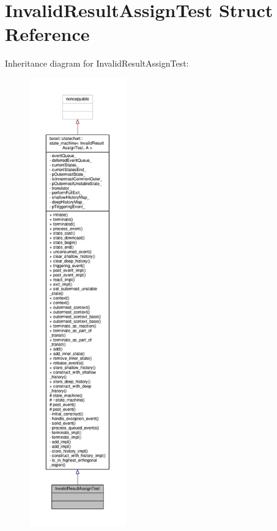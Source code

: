 \hypertarget{struct_invalid_result_assign_test}{}\section{Invalid\+Result\+Assign\+Test Struct Reference}
\label{struct_invalid_result_assign_test}


Inheritance diagram for Invalid\+Result\+Assign\+Test\+:
\nopagebreak
\begin{figure}[H]
\begin{center}
\leavevmode
\includegraphics[height=550pt]{struct_invalid_result_assign_test__inherit__graph}
\end{center}
\end{figure}


